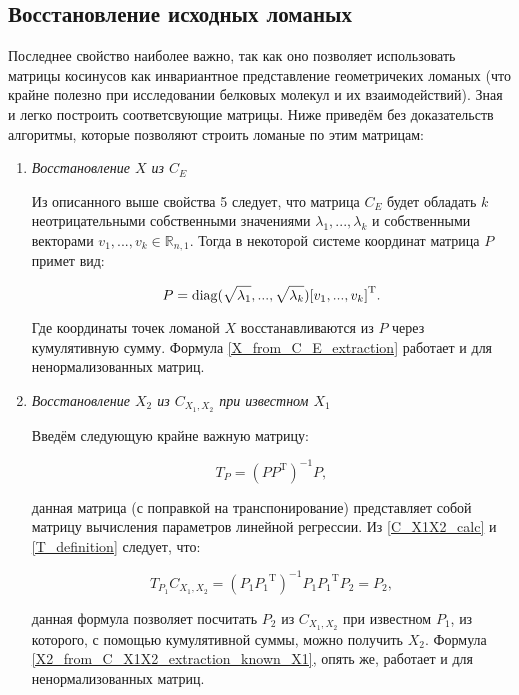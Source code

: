\subsection{Восстановление исходных ломаных}

Последнее свойство наиболее важно, так как оно позволяет использовать матрицы косинусов как инвариантное представление геометричеких ломаных (что крайне полезно при исследовании белковых молекул и их взаимодействий). Зная \label{C_E_calc} и \label{C_X1X2_calc} легко построить соответсвующие матрицы. Ниже приведём без доказательств алгоритмы, которые позволяют строить ломаные по этим матрицам:

\begin{enumerate}
\item \textit{Восстановление $X$ из $C_E$}

Из описанного выше свойства 5 следует, что матрица $C_E$ будет обладать $k$ неотрицательными собственными значениями $\lambda_1, ..., \lambda_k$ и собственными векторами $v_1, ..., v_k \in \mathbb{R}_{n,1}$. Тогда в некоторой системе координат матрица $P$ примет вид:

\begin{equation}
	P = \operatorname{diag}(\sqrt{\lambda_1}, ..., \sqrt{\lambda_k}){[v_1, ..., v_k]}^\mathrm{T}.
	\label{X_from_C_E_extraction}
\end{equation}

Где координаты точек ломаной $X$ восстанавливаются из $P$ через кумулятивную сумму. Формула \ref{X_from_C_E_extraction} работает и для ненормализованных матриц.

\item \textit{Восстановление $X_2$ из $C_{X_1, X_2}$ при известном $X_1$}

Введём следующую крайне важную матрицу:

\begin{equation}
	T_P = {(P{P}^\mathrm{T})}^{-1}P,
	\label{T_definition}
\end{equation}

данная матрица (с поправкой на транспонирование) представляет собой матрицу вычисления параметров линейной регрессии. Из \ref{C_X1X2_calc} и \ref{T_definition} следует, что:

\begin{equation}
	T_{P_1}C_{X_1, X_2} = {(P_1{P_1}^\mathrm{T})}^{-1}P_1{P_1}^\mathrm{T}{P_2} = P_2,
	\label{X2_from_C_X1X2_extraction_known_X1}
\end{equation}

данная формула позволяет посчитать $P_2$ из $C_{X_1, X_2}$ при известном $P_1$, из которого, с помощью кумулятивной суммы, можно получить $X_2$. Формула \ref{X2_from_C_X1X2_extraction_known_X1}, опять же, работает и для ненормализованных матриц.


\end{enumerate}
